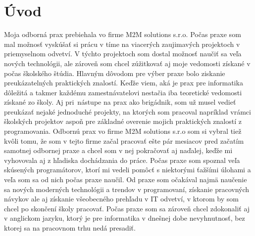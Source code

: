 \chapter{Úvod} %

Moja odborná prax prebiehala vo firme M2M solutions s.r.o. Počas praxe som mal možnosť vyskúšať si prácu v tíme na viacerých zaujimavých projektoch v priemyselnom odvetví. V týchto projektoch som dostal možnosť naučiť sa veľa nových technológii, ale zároveň som chcel zúžitkovať aj moje vedomosti získané v počas školského štúdia. Hlavným dôvodom pre výber praxe bolo ziskanie preukázatelných praktických znalostí. Keďže viem, aká je prax pre informatika dôležitá a takmer každému zamestnávatelovi nestačia iba teoretické vedomosti získané zo školy. Aj pri~nástupe na prax ako brigádnik, som už musel vedieť preukázať nejaké jednoduché projekty, na ktorých som pracoval napríklad vrámci školských projektov aspoň pre základné overenie mojich praktických znalostí z programovania.  Odbornú prax vo firme M2M solutions s.r.o som si vybral  tiež  kvôli tomu, že som v tejto firme začal pracovať ešte pár mesiacov pred začatím samotnej odbornej praxe a chcel som v nej pokračovať aj naďalej, keďže mi vyhovovala aj z hľadiska dochádzania do práce. Počas praxe  som spoznal veľa skúsených programátorov, ktorí mi vedeli pomôcť s niektorými ťažšími  úlohami a veľa som sa od nich počas praxe naučil. Od praxe som očakával najmä naučenie sa nových  moderných technológii a trendov v programovaní,  získanie pracovných návykov ale aj získanie všeobecného prehľadu v IT odvetví, v ktorom  by som chcel  po skončení školy pracovať. Počas praxe som sa zároveň chcel zdokonaliť aj v anglickom jazyku, ktorý je pre informatika v dnešnej dobe  nevyhnutnosť, bez ktorej sa na pracovnom trhu nedá presadiť.


